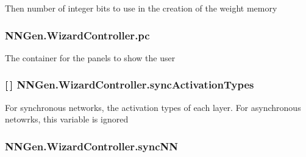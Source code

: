 Then number of integer bits to use in the creation of the weight memory 

\hypertarget{class_n_n_gen_1_1_wizard_controller_a9954efe53bf629492e68dd6692092a94}{}
\subsubsection[{pc}]{ N\+N\+Gen.\+Wizard\+Controller.\+pc\hspace{0.3cm}{\ttfamily [get]}}\label{class_n_n_gen_1_1_wizard_controller_a9954efe53bf629492e68dd6692092a94}


The container for the panels to show the user 

\hypertarget{class_n_n_gen_1_1_wizard_controller_ad211fa93c8e54fb2f0383889bcb28964}{}
\subsubsection[{sync\+Activation\+Types}]{ \mbox{[}$\,$\mbox{]} N\+N\+Gen.\+Wizard\+Controller.\+sync\+Activation\+Types\hspace{0.3cm}{\ttfamily [get]}}\label{class_n_n_gen_1_1_wizard_controller_ad211fa93c8e54fb2f0383889bcb28964}


For synchronous networks, the activation types of each layer. For asynchronous netowrks, this variable is ignored 

\hypertarget{class_n_n_gen_1_1_wizard_controller_a6231cf0c8041896d72a7225cc5cdef7f}{}
\subsubsection[{sync\+N\+N}]{ N\+N\+Gen.\+Wizard\+Controller.\+sync\+N\+N\hspace{0.3cm}{\ttfamily [get]}}\label{class_n_n_gen_1_1_wizard_controller_a6231cf0c8041896d72a7225cc5cdef7f}



